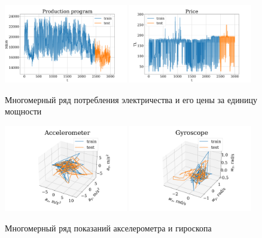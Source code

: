 			\begin{figure}[h]
				\centering
				\includegraphics[width=0.48\textwidth, keepaspectratio]{../figs/Electricity_Production}
				\includegraphics[width=0.48\textwidth, keepaspectratio]{../figs/Electricity_Price}
				\caption{Многомерный ряд потребления электричества и его цены за единицу мощности}\label{fig:electr_data}
			\end{figure}
			
			\begin{figure}[h]
				\centering
				\includegraphics[width=0.48\textwidth, keepaspectratio]{../figs/acceleromter_1.png}
				\includegraphics[width=0.48\textwidth, keepaspectratio]{../figs/gyro_1.png}
				\caption{Многомерный ряд показаний акселерометра и гироскопа}\label{fig:motion_data}
			\end{figure}
			

